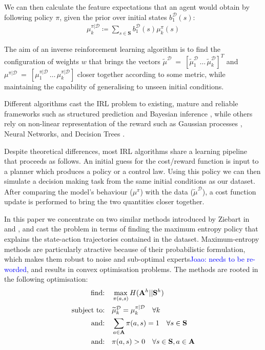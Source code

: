 \documentclass[letterpaper]{article}
\newcommand{\jm}[1]{\textcolor{blue}{Joao: #1}}
\newcommand{\jm}[1]{}
\begin{document}
We can then calculate the feature expectations that an agent would obtain by following policy $\pi$, given the prior over initial states $b_1^{\mathcal D}(s)$:
\begin{align}
  \label{eq:feature_expectation_belief}
  \mu^{\pi|\mathcal{D}}_k \coloneqq \sum_{s\in\mathbf{S}}b_1^{\mathcal{D}}(s)\mu^{\pi}_k(s)
\end{align}

The aim of an inverse reinforcement learning algorithm is to find the configuration of weights $w$ that brings the vectors $\widetilde\mu^{\mathcal{D}}~=~[\widetilde\mu^{\mathcal{D}}_1\,\ldots\,\widetilde\mu^{\mathcal{D}}_k]^T$ and $\mu^{\pi|\mathcal{D}}~=~[\mu^{\pi|\mathcal{D}}_1\,\ldots\,\mu^{\pi|\mathcal{D}}_k]$ closer together according to some metric, while maintaining the capability of generalising to unseen initial conditions.

Different algorithms cast the IRL problem to existing, mature and reliable frameworks such as structured prediction \cite{ratliff2006maximum} and Bayesian inference \cite{ramachandran2007bayesian}, while others rely on non-linear representation of the reward such as Gaussian processes \cite{levine2011nonlinear}, Neural Networks, and Decision Trees \cite{ratliff200w7boosting}. 

Despite theoretical differences, most IRL algorithms share a learning pipeline that proceeds as follows. An initial guess for the cost/reward function is input to a planner which produces a policy or a control law. Using this policy we can then simulate a decision making task from the same initial conditions as our dataset. After comparing the model's behaviour ($\mu^{\pi}$)  with the data ($\widetilde{\mu}^{\mathcal{D}}$), a cost function update is performed to bring the two quantities closer together.

In this paper we concentrate on two similar methods introduced by Ziebart in \cite{ziebart2008maximum} and \cite{ziebart2010modelingthesis}, and cast the problem in terms of finding the maximum entropy policy that explains the state-action trajectories contained in the dataset. Maximum-entropy methods are particularly atractive because of their probabilistic formulation, which makes them robust to noise and sub-optimal experts\jm{needs to be re-worded}, and results in convex optimisation problems. The methods are rooted in the following optimisation:
\begin{align}
	\hbox{find:}\quad &\max\limits_{\pi(a,s)} H(\mathbf{A}^h||\mathbf{S}^h)\\
\hbox{subject to:}\quad &\widetilde{\mu}^{\mathcal{D}}_k   = \mu^{\pi|\mathcal{D}}_k \quad \forall k \label{eq:good_ineq}\\
\hbox{and:}\quad &\sum_{a\in\mathbf{A}}\pi(a,s)  = 1 \quad \forall s\in\mathbf{S}\\
\hbox{and:}\quad &\pi(a,s)  > 0 \quad \forall s\in\mathbf{S},a\in\mathbf{A}  
\end{align}
\end{document}
